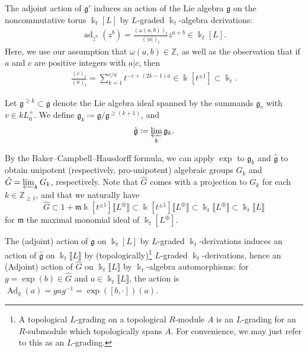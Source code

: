 \documentclass{amsart}
\DeclareMathOperator{\Ad}{Ad}
\DeclareMathOperator{\ad}{ad}
\let\llb=\llbracket
\let\rrb=\rrbracket
\let\bb=\mathbb
\let\f=\mathfrak
\newcommand {\kk} {\Bbbk}
\newcommand {\kt} {\kk_t}
\theoremstyle{plain}%
\theoremstyle{definition}
\theoremstyle{remark}
\begin{document}
The adjoint action of $\f{g}'$ induces an action of the Lie algebra $\f{g}$ on the noncommutative torus $\kk_t[L]$ by $L$-graded $\kt$-algebra derivations:
\begin{align*}
    \ad_{\hat{z}^a}(z^b) = \frac{(\omega(a,b))_t}{(|a|)_{t}} z^{a+b} \in \kk_t[L].
\end{align*}
Here, we use our assumption that $\omega(a,b)\in \bb{Z}$, as well as the observation that if $a$ and $c$ are positive integers with $a|c$, then 
\begin{align}\label{tquotient}
    \frac{(c)_{t}}{(a)_{t}} = \sum_{k=1}^{c/a} t^{-c+(2k-1)a}\in \kk[t^{\pm 1}]\subset \kt.
\end{align}


Let $\f{g}^{\geq k}\subset \f{g}$ denote the Lie algebra ideal spanned by the summands $\f{g}_v$ with $v\in kL_0^+$.  We define $\f{g}_k\coloneqq \f{g}/\f{g}^{\geq (k+1)}$, and
\begin{align*}
    \hat{\f{g}}\coloneqq \varprojlim_k \f{g}_k.
\end{align*}

By the Baker--Campbell--Hausdorff formula, we can apply $\exp$ to $\f{g}_k$ and $\hat{\f{g}}$ to obtain unipotent (respectively, pro-unipotent) algebraic groups $G_k$ and $\hat{G}=\varprojlim_k G_k$, respectively.  Note that $\hat{G}$ comes with a projection to $G_k$ for each $k\in \bb{Z}_{\geq 1}$, and that we naturally have $$\hat{G}\subset 1+\f{m}\kk[t^{\pm 1}]\llb L^{\oplus}\rrb\subset \kk[t^{\pm 1}]\llb L^{\oplus}\rrb\subset \kk_t\llb L^{\oplus}\rrb \subset \kk_t\llb L\rrb$$ for $\f{m}$ the maximal monomial ideal of $\kk_t[L^{\oplus}]$.  


The (adjoint) action of $\f{g}$ on $\kk_t[L]$ by $L$-graded $\kt$-derivations induces an action of $\hat{\f{g}}$ on $\kk_t\llb L\rrb$ by (topologically)\footnote{A topological $L$-grading on a topological $R$-module $A$ is an $L$-grading for an $R$-submodule which topologically spans $A$.  For convenience, we may just refer to this as an $L$-grading.} $L$-graded $\kt$-derivations, hence an (Adjoint) action of $\hat{G}$ on $\kk_t\llb L\rrb$ by $\kt$-algebra automorphisms: for $g=\exp(b)\in \hat{G}$ and $a\in \kk_t\llb L\rrb$, the action is $\Ad_g(a)=gag^{-1}=\exp([b,\cdot])(a)$.
\end{document}
